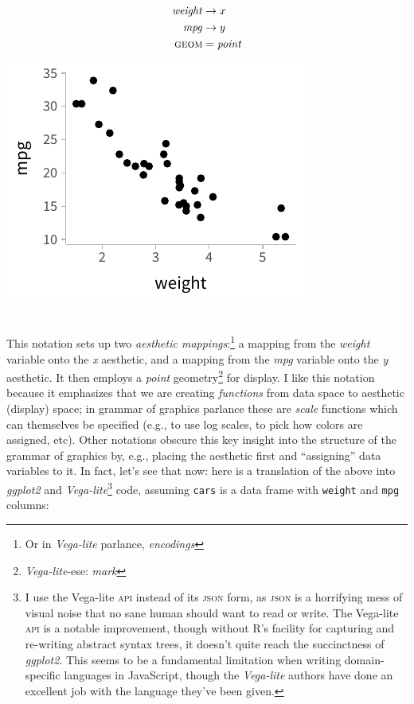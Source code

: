 \documentclass[journal]{vgtc}                     %
\newcommand{\equationfigure}[2]{%
\noindent
\begin{minipage}{.5\columnwidth}
\setlength{\abovedisplayskip}{0pt}
\setlength{\belowdisplayskip}{0pt}
#1\end{minipage}%
\begin{minipage}{.4\columnwidth}\centering #2 \end{minipage}%
\vspace{.5\belowdisplayskip}\\
}
\begin{document}
\equationfigure{
\begin{align*}
\mathit{weight} &\rightarrow x\\
\mathit{mpg} &\rightarrow y\\
\textsc{geom} &= \mathit{point}
\end{align*}
}{\includegraphics[width=1.2\columnwidth]{figs/2-mpg_v_weight.pdf}}
This notation sets up two \textit{aesthetic mappings}:\footnote{Or in \textit{Vega-lite} parlance, \textit{encodings}} a mapping from the \textit{weight} variable onto the \textit{x} aesthetic, and a mapping from the \textit{mpg} variable onto the \textit{y} aesthetic. It then employs a \textit{point} geometry\footnote{\textit{Vega-lite}-ese: \textit{mark}} for display. I like this notation because it emphasizes that we are creating \textit{functions} from data space to aesthetic (display) space; in grammar of graphics parlance these are \textit{scale} functions which can themselves be specified (e.g., to use log scales, to pick how colors are assigned, etc). Other notations obscure this key insight into the structure of the grammar of graphics by, e.g., placing the aesthetic first and ``assigning'' data variables to it.
In fact, let's see that now: here is a translation of the above into \textit{ggplot2} and \textit{Vega-lite}\footnote{I use the Vega-lite \textsc{api} instead of its \textsc{json} form, as \textsc{json} is a horrifying mess of visual noise that no sane human should want to read or write. The Vega-lite \textsc{api} is a notable improvement, though without R's facility for capturing and re-writing abstract syntax trees, it doesn't quite reach the succinctness of \textit{ggplot2}. This seems to be a fundamental limitation when writing domain-specific languages in JavaScript, though the \textit{Vega-lite} authors have done an excellent job with the language they've been given.} code, assuming \texttt{cars} is a data frame with \texttt{weight} and \texttt{mpg} columns:
\end{document}
